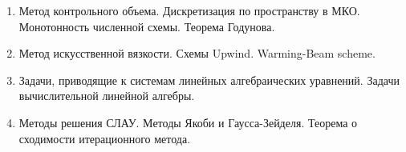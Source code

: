 \documentclass[12pt,a4paper]{extarticle}
\begin{document}
\begin{enumerate}
		\item Метод контрольного объема. Дискретизация по пространству в МКО. Монотонность численной схемы. Теорема Годунова.

		\item Метод искусственной вязкости. Схемы Upwind. Warming-Beam scheme.


		\item Задачи, приводящие к системам линейных алгебраических уравнений. Задачи вычислительной линейной алгебры.

		\item Методы решения СЛАУ. Методы Якоби и Гаусса-Зейделя. Теорема о сходимости итерационного метода.

    \end{enumerate}
\end{document}
